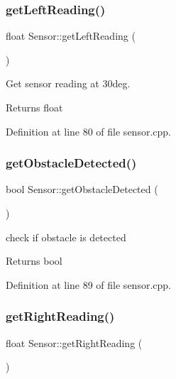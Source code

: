 \subsubsection{\texorpdfstring{get\+Left\+Reading()}{getLeftReading()}}
{\footnotesize\ttfamily float Sensor\+::get\+Left\+Reading (\begin{DoxyParamCaption}{ }\end{DoxyParamCaption})}



Get sensor reading at 30deg. 

\begin{DoxyReturn}{Returns}
float 
\end{DoxyReturn}


Definition at line 80 of file sensor.\+cpp.

\mbox{\label{class_sensor_af590a94a155718952a71ee842a0db661}} 
\subsubsection{\texorpdfstring{get\+Obstacle\+Detected()}{getObstacleDetected()}}
{\footnotesize\ttfamily bool Sensor\+::get\+Obstacle\+Detected (\begin{DoxyParamCaption}{ }\end{DoxyParamCaption})}



check if obstacle is detected 

\begin{DoxyReturn}{Returns}
bool 
\end{DoxyReturn}


Definition at line 89 of file sensor.\+cpp.

\mbox{\label{class_sensor_a784ee9b741908df505a51d0807dbbe9b}} 
\subsubsection{\texorpdfstring{get\+Right\+Reading()}{getRightReading()}}
{\footnotesize\ttfamily float Sensor\+::get\+Right\+Reading (\begin{DoxyParamCaption}{ }\end{DoxyParamCaption})}



